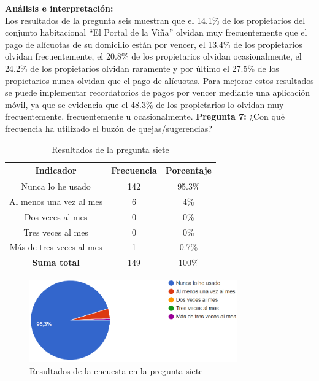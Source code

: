 \textbf{Análisis e interpretación:}\\
Los resultados de la pregunta seis muestran que el 14.1\% de los propietarios del conjunto habitacional {\textquotedblleft}El Portal de la Viña{\textquotedblright} olvidan muy frecuentemente que el pago de alícuotas de su domicilio están por vencer, el 13.4\% de los propietarios olvidan frecuentemente, el 20.8\% de los propietarios olvidan ocasionalmente, el 24.2\% de los propietarios olvidan raramente y por último el 27.5\% de los propietarios nunca olvidan que el pago de alícuotas.
Para mejorar estos resultados se puede implementar recordatorios de pagos por vencer mediante una aplicación móvil, ya que se evidencia que el 48.3\% de los propietarios lo olvidan muy frecuentemente, frecuentemente u ocasionalmente.
\bigbreak
\textbf{Pregunta 7:} ¿Con qué frecuencia ha utilizado el buzón de quejas/sugerencias?


\begin{table}[H]
        \centering
        \caption{Resultados de la pregunta siete}
        \begin{footnotesize}
        \begin{tabular}{|c|c|c|}
            \hline
            \textbf{Indicador} & \textbf{Frecuencia} &  \textbf{Porcentaje} \\
            \hline
            Nunca lo he usado & 142 & 95.3\% \\
            \hline
            Al menos una vez al mes & 6 & 4\% \\
            \hline
            Dos veces al mes & 0 & 0\% \\
            \hline
            Tres veces al mes & 0 & 0\% \\
            \hline
            Más de tres veces al mes & 1 & 0.7\% \\
            \hline
            \textbf{Suma total} & 149 & 100\% \\
            \hline
        \end{tabular}\label{tab:table_preg_7}
        \end{footnotesize}
    \end{table}

    \begin{figure}[H]
        \centering
        \includegraphics[width=0.8\textwidth]{resources/images/p7}
        \caption{Resultados de la encuesta en la pregunta siete}\label{fig:figure_p7}
    \end{figure}


